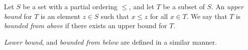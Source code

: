 \documentclass{article}
\begin{document}
Let $S$ be a set with a partial ordering $\leq$, and let $T$ be a subset of $S$. 
An {\em upper bound} for $T$ is an element $z \in S$ such that $x \leq z$ for all $x \in T$. We say that $T$ is {\em bounded from above} if there exists an upper bound for $T$.

{\em Lower bound}, and \emph{bounded from below} are defined in a similar manner.
\end{document}
